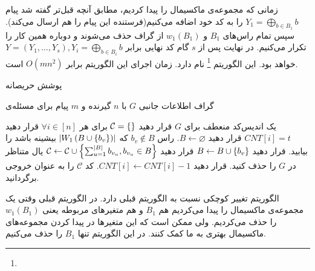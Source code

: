 زمانی که مجموعه‌ی ماکسیمال را پیدا کردیم، مطابق آنچه قبل‌تر گفته شد پیام
$Y_1 = \bigoplus\limits_{b \in B_1} b$
را به کد خود اضافه می‌کنیم(فرستنده این پیام را هم ارسال می‌کند). سپس تمام راس‌های
$B_1$
و
$w_1(B_1)$
از گراف حذف می‌شوند و دوباره همین کار را تکرار می‌کنیم. در نهایت پس از
$s$
گام کد نهایی برابر
$Y = (Y_1, \ldots, Y_s), Y_i =  \bigoplus\limits_{b \in B_i} b$
خواهد بود. این الگوریتم
\GRCOVone\footnote{}
نام دارد. زمان اجرای این الگوریتم برابر
$O(mn^2)$
است.
\begin{algorithm}
    \caption[
        پوشش حریصانه
    ]{
        پوشش حریصانه
        \cite{pliable2015paper}}
    \label{algorithm:grcov}
    \begin{algorithmic}[1]
        \Require
        گراف اطلاعات جانبی
        $G$
        با
        $n$
        گیرنده و
        $m$
        پیام برای مسئله‌ی

        \Ensure
        یک اندیس‌کد منعطف برای
        $G$
        \State
        قرار دهید
        $\mathcal{C} = \left\{  \right\}$
        \State برای هر
        $\forall i \in [n]$
        قرار دهید
        $CNT[i] = t$
            \State
            قرار دهید
            $B \leftarrow \varnothing$.
                \State
                راس
                $b_v \notin B$
                که
                $\left|{W_1\left(B \cup\left\{ b_v \right\}\right)}\right|$
                بیشینه باشد را بیابید.
                \State قرار دهید
                $B \leftarrow B \cup\left\{ b_v \right\}$
            \EndWhile
            \State قرار دهید
            $\mathcal{C} \leftarrow \mathcal{C} \cup\left\{ \sum_{u=1}^{\left|{B}\right|} b_{v_u}, b_{v_u} \in B \right\}$
                    \State یال متناظر در
                    $G$
                    را حذف کنید.
                \EndIf
                \State قرار دهید $CNT[i] \leftarrow CNT[i]-1$.
            \EndFor
        \EndWhile
        \State کد
        $\mathcal{C}$
        را به عنوان خروجی برگردانید.
    \end{algorithmic}
\end{algorithm}

الگوریتم
تغییر کوچکی نسبت به الگوریتم قبلی دارد. در الگوریتم قبلی وقتی یک مجموعه‌ی ماکسیمال را پیدا می‌کردیم هم
$B_1$
و هم متغیرهای مربوطه یعنی
$w_1(B_1)$
را حذف می‌کردیم. ولی ممکن است که این متغیرها در پیدا کردن مجموعه‌های ماکسیمال بهتری به ما کمک کنند. در این الگوریتم تنها
$B_1$
را حذف می‌کنیم.

